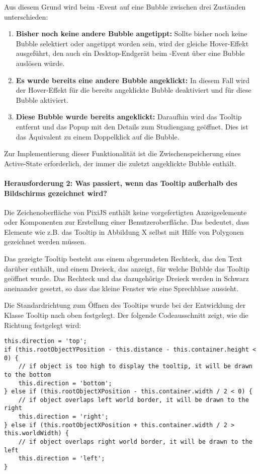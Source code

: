 Aus diesem Grund wird beim -Event auf eine Bubble zwischen drei Zuständen unterschieden:

\begin{enumerate}
    \item \textbf{Bisher noch keine andere Bubble angetippt:} Sollte bisher noch keine Bubble selektiert oder angetippt worden sein, wird der gleiche Hover-Effekt ausgeführt, den auch ein Desktop-Endgerät beim -Event über eine Bubble auslösen würde.
    \item \textbf{Es wurde bereits eine andere Bubble angeklickt:} In diesem Fall wird der Hover-Effekt für die bereits angeklickte Bubble deaktiviert und für diese Bubble aktiviert.
    \item \textbf{Diese Bubble wurde bereits angeklickt:} Daraufhin wird das Tooltip entfernt und das Popup mit den Details zum Studiengang geöffnet. Dies ist das Äquivalent zu einem Doppelklick auf die Bubble.
\end{enumerate}

Zur Implementierung dieser Funktionalität ist die Zwischenspeicherung eines Active-State erforderlich, der immer die zuletzt angeklickte Bubble enthält.

\paragraph*{Herausforderung 2: Was passiert, wenn das Tooltip außerhalb des Bildschirms gezeichnet wird?}
Die Zeichenoberfläche von PixiJS enthält keine vorgefertigten Anzeigeelemente oder Komponenten zur Erstellung einer Benutzeroberfläche. Das bedeutet, dass Elemente wie z.B. das Tooltip in Abbildung X selbst mit Hilfe von Polygonen gezeichnet werden müssen.

Das gezeigte Tooltip besteht aus einem abgerundeten Rechteck, das den Text darüber enthält, und einem Dreieck, das anzeigt, für welche Bubble das Tooltip geöffnet wurde. Das Rechteck und das dazugehörige Dreieck werden in Schwarz aneinander gesetzt, so dass das kleine Fenster wie eine Sprechblase aussieht.

Die Standardrichtung zum Öffnen des Tooltips wurde bei der Entwicklung der Klasse Tooltip nach oben festgelegt. Der folgende Codeausschnitt zeigt, wie die Richtung festgelegt wird:

\begin{lstlisting}[style=Python]
this.direction = 'top';
if (this.rootObjectYPosition - this.distance - this.container.height < 0) {
    // if object is too high to display the tooltip, it will be drawn to the bottom
    this.direction = 'bottom';
} else if (this.rootObjectXPosition - this.container.width / 2 < 0) {
    // if object overlaps left world border, it will be drawn to the right        
    this.direction = 'right';
} else if (this.rootObjectXPosition + this.container.width / 2 > this.worldWidth) {
    // if object overlaps right world border, it will be drawn to the left
    this.direction = 'left';
}
\end{lstlisting}

